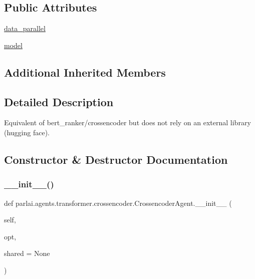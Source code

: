 \subsection*{Public Attributes}
\begin{DoxyCompactItemize}
\item 
\hyperlink{classparlai_1_1agents_1_1transformer_1_1crossencoder_1_1CrossencoderAgent_a991c76bbbb234ba482e3eaf3b6813bc8}{data\+\_\+parallel}
\item 
\hyperlink{classparlai_1_1agents_1_1transformer_1_1crossencoder_1_1CrossencoderAgent_a53447e9640405f06d1458eec65db5525}{model}
\end{DoxyCompactItemize}
\subsection*{Additional Inherited Members}


\subsection{Detailed Description}
\begin{DoxyVerb}Equivalent of bert_ranker/crossencoder but does not rely on an external library
(hugging face).
\end{DoxyVerb}
 

\subsection{Constructor \& Destructor Documentation}
\mbox{\label{classparlai_1_1agents_1_1transformer_1_1crossencoder_1_1CrossencoderAgent_a22295a739ff290d96c45efd0bfd550bb}} 
\subsubsection{\texorpdfstring{\+\_\+\+\_\+init\+\_\+\+\_\+()}{\_\_init\_\_()}}
{\footnotesize\ttfamily def parlai.\+agents.\+transformer.\+crossencoder.\+Crossencoder\+Agent.\+\_\+\+\_\+init\+\_\+\+\_\+ (\begin{DoxyParamCaption}\item[{}]{self,  }\item[{}]{opt,  }\item[{}]{shared = {\ttfamily None} }\end{DoxyParamCaption})}



